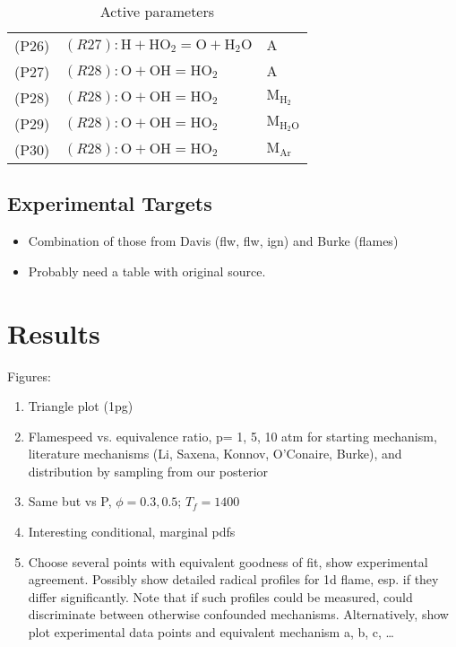 \documentclass[preprint,3p,times,twocolumn]{elsarticle}
\begin{document}
\begin{itemize}
\begin{table}[htp]
\begin{tabular}{l l l}
(P26)&$ (R27): \mathrm{H} + \mathrm{HO}_2 = \mathrm{O} + \mathrm{H}_2\mathrm{O}     $&$ \mathrm{A}$\\
(P27)&$ (R28): \mathrm{O} + \mathrm{OH} = \mathrm{HO}_2     $&$ \mathrm{A}$\\
(P28)&$ (R28): \mathrm{O} + \mathrm{OH} = \mathrm{HO}_2     $&$ \mathrm{M}_{\mathrm{H}_2}$\\
(P29)&$ (R28): \mathrm{O} + \mathrm{OH} = \mathrm{HO}_2     $&$ \mathrm{M}_{\mathrm{H}_2\mathrm{O}}$\\
(P30)&$ (R28): \mathrm{O} + \mathrm{OH} = \mathrm{HO}_2     $&$ \mathrm{M}_{\mathrm{Ar}}$\\
\hline
\end{tabular}
    \caption{Active parameters}
    \label{tab:parameters}
  \end{table}
\end{itemize}
\subsection{Experimental Targets}
\begin{itemize}
\item Combination of those from Davis (flw, flw, ign) and Burke
  (flames)
\item Probably need a table with original source.
\end{itemize}
\section{Results}
Figures:
\begin{enumerate}
\item Triangle plot (1pg)
\item Flamespeed vs. equivalence ratio, p= 1, 5, 10 atm for starting
  mechanism, literature mechanisms (Li, Saxena, Konnov, O'Conaire,
  Burke), and distribution by sampling from our posterior
\item Same but vs P, $\phi=0.3,0.5$; $T_f=1400$
    \item Interesting conditional, marginal pdfs
    \item Choose several points with equivalent goodness of fit, show
      experimental agreement. Possibly show detailed radical profiles
      for 1d flame, esp. if they differ significantly. Note that if
      such profiles could be measured, could discriminate between
      otherwise confounded mechanisms. Alternatively, show plot
      experimental data points and equivalent mechanism a, b, c,
      \ldots
 \end{enumerate}
 
\end{document}
